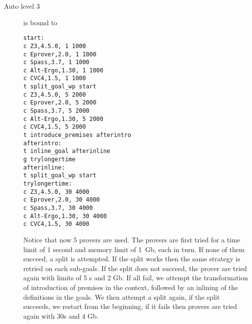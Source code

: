 \begin{description}
\item[Auto level 3] is bound to
\begin{verbatim}
start:
c Z3,4.5.0, 1 1000
c Eprover,2.0, 1 1000
c Spass,3.7, 1 1000
c Alt-Ergo,1.30, 1 1000
c CVC4,1.5, 1 1000
t split_goal_wp start
c Z3,4.5.0, 5 2000
c Eprover,2.0, 5 2000
c Spass,3.7, 5 2000
c Alt-Ergo,1.30, 5 2000
c CVC4,1.5, 5 2000
t introduce_premises afterintro
afterintro:
t inline_goal afterinline
g trylongertime
afterinline:
t split_goal_wp start
trylongertime:
c Z3,4.5.0, 30 4000
c Eprover,2.0, 30 4000
c Spass,3.7, 30 4000
c Alt-Ergo,1.30, 30 4000
c CVC4,1.5, 30 4000
\end{verbatim}
  Notice that now 5 provers are used.  The provers are first tried for
  a time limit of 1 second and memory limit of 1~Gb, each in turn. If
  none of them succeed, a split is attempted. If the split works then
  the same strategy is retried on each sub-goals. If the split does
  not succeed, the prover are tried again with limits of 5 s and 2
  Gb. If all fail, we attempt the transformation of introduction of
  premises in the context, followed by an inlining of the definitions
  in the goals. We then attempt a split again, if the split succeeds,
  we restart from the beginning, if it fails then provers are tried
  again with 30s and 4 Gb.

\end{description}

